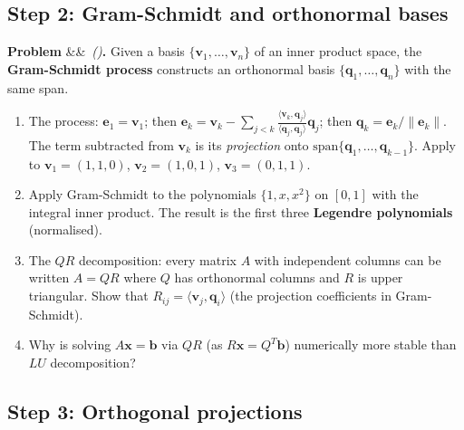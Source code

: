 \documentclass[12pt,a4paper]{article}
\newcounter{problem}
\newenvironment{problem}[1][]{\refstepcounter{problem}\par\vspace{6pt}\noindent\textbf{\color{MidBlue}Problem \theproblem}\ifx&#1&\else\ \textit{(#1)}\fi\textbf{.}\enskip}{\par\vspace{4pt}}
\begin{document}
\subsection{Step 2: Gram-Schmidt and orthonormal bases}

\begin{problem}
Given a basis $\{\mathbf{v}_1,\ldots,\mathbf{v}_n\}$ of an inner product space, the \textbf{Gram-Schmidt process} constructs an orthonormal basis $\{\mathbf{q}_1,\ldots,\mathbf{q}_n\}$ with the same span.

\begin{enumerate}[label=(\alph*),topsep=2pt]
  \item The process: $\mathbf{e}_1 = \mathbf{v}_1$; then $\mathbf{e}_k = \mathbf{v}_k - \sum_{j<k}\frac{\langle\mathbf{v}_k,\mathbf{q}_j\rangle}{\langle\mathbf{q}_j,\mathbf{q}_j\rangle}\mathbf{q}_j$; then $\mathbf{q}_k = \mathbf{e}_k/\|\mathbf{e}_k\|$. The term subtracted from $\mathbf{v}_k$ is its \emph{projection} onto $\text{span}\{\mathbf{q}_1,\ldots,\mathbf{q}_{k-1}\}$. Apply to $\mathbf{v}_1=(1,1,0)$, $\mathbf{v}_2=(1,0,1)$, $\mathbf{v}_3=(0,1,1)$.
  \item Apply Gram-Schmidt to the polynomials $\{1,x,x^2\}$ on $[0,1]$ with the integral inner product. The result is the first three \textbf{Legendre polynomials} (normalised).
  \item The $QR$ decomposition: every matrix $A$ with independent columns can be written $A = QR$ where $Q$ has orthonormal columns and $R$ is upper triangular. Show that $R_{ij} = \langle\mathbf{v}_j,\mathbf{q}_i\rangle$ (the projection coefficients in Gram-Schmidt).
  \item Why is solving $A\mathbf{x}=\mathbf{b}$ via $QR$ (as $R\mathbf{x}=Q^T\mathbf{b}$) numerically more stable than $LU$ decomposition?
\end{enumerate}
\end{problem}

\subsection{Step 3: Orthogonal projections}
\end{document}
